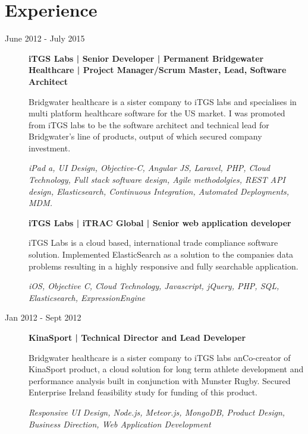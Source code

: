 \section{Experience}
\begin{description}

\item [June 2012 - July 2015] 
\textbf{iTGS Labs | Senior Developer | Permanent
Bridgewater Healthcare | Project Manager/Scrum Master, Lead, Software Architect
}

Bridgwater healthcare is a sister company to iTGS labs and specialises in multi platform healthcare software for the US market.
I was promoted from iTGS labs to be the software architect and technical lead for Bridgwater’s line of products, output of which secured company investment.

\textit{iPad a, UI Design, Objective-C,  Angular JS, Laravel, PHP, Cloud Technology, Full stack software design, Agile methodolgies,  REST API design, Elasticsearch, Continuous Integration, Automated Deployments, MDM.}

\textbf{iTGS Labs | iTRAC Global | Senior web application developer}

iTGS Labs is a cloud based, international trade compliance software solution.
Implemented ElasticSearch as a solution to the companies data problems resulting in a highly responsive and fully searchable application.

\textit{iOS, Objective C, Cloud Technology, Javascript, jQuery, PHP, SQL, Elasticsearch, ExpressionEngine}

\item [Jan 2012 - Sept 2012] 
\textbf{KinaSport | Technical Director and Lead Developer}

Bridgwater healthcare is a sister company to iTGS labs anCo-creator of KinaSport product, a cloud solution for long term athlete development and performance analysis built in conjunction with Munster Rugby.
Secured Enterprise Ireland feasibility study for funding of this product.

\textit{Responsive UI Design, Node.js, Meteor.js, MongoDB, Product Design, Business Direction, Web Application Development}

\end{description}